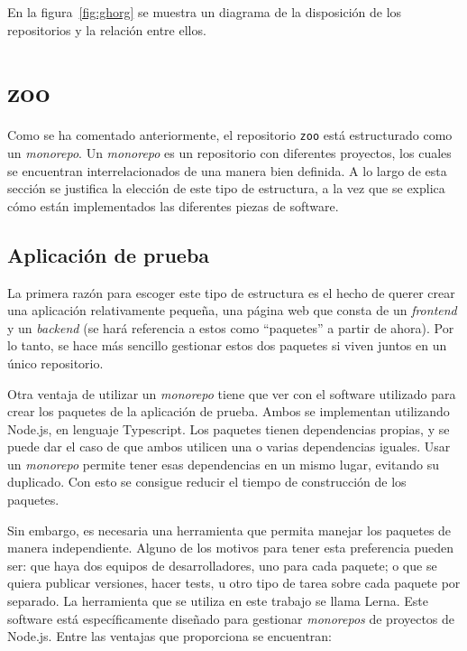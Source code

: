 En la figura~\ref{fig:ghorg} se muestra un diagrama de la disposición de los repositorios y la relación entre ellos.

\section{zoo}

Como se ha comentado anteriormente, el repositorio \texttt{zoo} está estructurado como un \textit{monorepo}. Un \textit{monorepo} es un repositorio con diferentes proyectos, los cuales se encuentran interrelacionados de una manera bien definida. A lo largo de esta sección se justifica la elección de este tipo de estructura, a la vez que se explica cómo están implementados las diferentes piezas de software.

\subsection*{Aplicación de prueba}

La primera razón para escoger este tipo de estructura es el hecho de querer crear una aplicación relativamente pequeña, una página web que consta de un \textit{frontend} y un \textit{backend} (se hará referencia a estos como ``paquetes'' a partir de ahora). Por lo tanto, se hace más sencillo gestionar estos dos paquetes si viven juntos en un único repositorio.

Otra ventaja de utilizar un \textit{monorepo} tiene que ver con el software utilizado para crear los paquetes de la aplicación de prueba. Ambos se implementan utilizando Node.js, en lenguaje Typescript\cite{ts}. Los paquetes tienen dependencias propias, y se puede dar el caso de que ambos utilicen una o varias dependencias iguales. Usar un \textit{monorepo} permite tener esas dependencias en un mismo lugar, evitando su duplicado. Con esto se consigue reducir el tiempo de construcción de los paquetes.

Sin embargo, es necesaria una herramienta que permita manejar los paquetes de manera independiente. Alguno de los motivos para tener esta preferencia pueden ser: que haya dos equipos de desarrolladores, uno para cada paquete; o que se quiera publicar versiones, hacer tests, u otro tipo de tarea sobre cada paquete por separado. La herramienta que se utiliza en este trabajo se llama Lerna\cite{lerna}. Este software está específicamente diseñado para gestionar \textit{monorepos} de proyectos de Node.js. Entre las ventajas que proporciona se encuentran:

